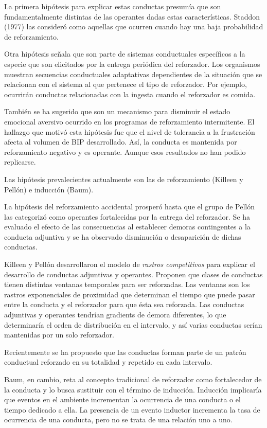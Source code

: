 \documentclass[a4paper,12pt]{article}
\begin{document}
La primera hipótesis para explicar estas conductas presumía que son fundamentalmente distintas de las operantes dadas estas características. Staddon (1977) las consideró como aquellas que ocurren cuando hay una baja probabilidad de reforzamiento.

Otra hipótesis señala que son parte de sistemas conductuales específicos a la especie que son elicitados por la entrega periódica del reforzador. Los organismos muestran secuencias conductuales adaptativas dependientes de la situación que se relacionan con el sistema al que pertenece el tipo de reforzador. Por ejemplo, ocurrirán conductas relacionadas con la ingesta cuando el reforzador es comida.

También se ha sugerido que son un mecanismo para disminuir el estado emocional aversivo ocurrido en los programas de reforzamiento intermitente. El hallazgo que motivó esta hipótesis fue que el nivel de tolerancia a la frustración afecta al volumen de BIP desarrollado. Así, la conducta es mantenida por reforzamiento negativo y es operante. Aunque esos resultados no han podido replicarse.

Las hipótesis prevalecientes actualmente son las de reforzamiento (Killeen y Pellón) e inducción (Baum).

La hipótesis del reforzamiento accidental prosperó hasta que el grupo de Pellón las categorizó como operantes fortalecidas por la entrega del reforzador. Se ha evaluado el efecto de las consecuencias al establecer demoras contingentes a la conducta adjuntiva y se ha observado disminución o desaparición de dichas conductas.

Killeen y Pellón desarrollaron el modelo de {\itshape rastros competitivos} para explicar el desarrollo de conductas adjuntivas y operantes. Proponen que clases de conductas tienen distintas ventanas temporales para ser reforzadas. Las ventanas son los rastros exponenciales de proximidad que determinan el tiempo que puede pasar entre la conducta y el reforzador para que ésta sea reforzada. Las conductas adjuntivas y operantes tendrían gradients de demora diferentes, lo que determinaría el orden de distribución en el intervalo, y así varias conductas serían mantenidas por un solo reforzador.

Recientemente se ha propuesto que las conductas forman parte de un patrón conductual reforzado en su totalidad y repetido en cada intervalo.

Baum, en cambio, reta al concepto tradicional de reforzador como fortalecedor de la conducta y lo busca sustituir con el término de inducción. Inducción implicaría que eventos en el ambiente incrementan la ocurrencia de una conducta o el tiempo dedicado a ella. La presencia de un evento inductor incrementa la tasa de ocurrencia de una conducta, pero no se trata de una relación uno a uno.
\end{document}
